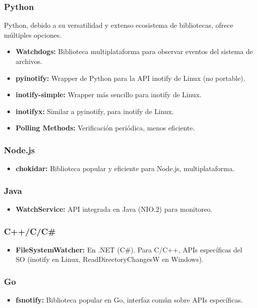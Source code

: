 \subsubsection{Python}
Python, debido a su versatilidad y extenso ecosistema de bibliotecas, ofrece múltiples opciones.
\begin{itemize}
\item \textbf{Watchdogs:} Biblioteca multiplataforma para observar eventos del sistema de archivos.
\item \textbf{pyinotify:} Wrapper de Python para la API inotify de Linux (no portable).
\item \textbf{inotify-simple:} Wrapper más sencillo para inotify de Linux.
\item \textbf{inotifyx:} Similar a pyinotify, para inotify de Linux.
\item \textbf{Polling Methods:} Verificación periódica, menos eficiente.
\end{itemize}

\subsubsection{Node.js}
\begin{itemize}
\item \textbf{chokidar:} Biblioteca popular y eficiente para Node.js, multiplataforma.
\end{itemize}

\subsubsection{Java}
\begin{itemize}
\item \textbf{WatchService:} API integrada en Java (NIO.2) para monitoreo.
\end{itemize}

\subsubsection{C++/C/C\#}
\begin{itemize}
\item \textbf{FileSystemWatcher:} En .NET (C\#). Para C/C++, APIs específicas del SO (inotify en Linux, ReadDirectoryChangesW en Windows).
\end{itemize}

\subsubsection{Go}
\begin{itemize}
\item \textbf{fsnotify:} Biblioteca popular en Go, interfaz común sobre APIs específicas.
\end{itemize}

